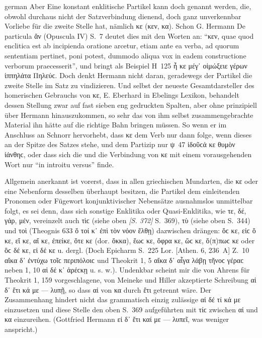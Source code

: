 \begin{otherlanguage*}{german}
Aber Eine konstant enklitische Partikel kann doch genannt werden, die, obwohl durchaus nicht der Satzverbindung dienend, doch ganz unverkennbar Vorliebe für die zweite Stelle hat, nämlich κε (κεν, κα). Schon G. Hermann De particula ἄν (Opuscula IV) S.~7 deutet dies mit den Worten an: “κεν, quae quod enclitica est ab incipienda oratione arcetur, etiam ante ea verba, ad quorum sententiam pertinet, poni potest, dummodo aliqua vox in eadem constructione verborum praecesserit”, und bringt als Beispiel Η~125 ἦ κε μέγ᾽ οἰμώξειε γέρων ἱππηλάτα Πηλεύϲ. Doch denkt Hermann nicht daran, geradewegs der Partikel die zweite Stelle im Satz zu vindizieren. Und selbst der neueste Gesamtdarsteller des homerischen Gebrauchs von κε, Ε. Eberhard in Ebelings Lexikon, behandelt dessen Stellung zwar auf fast sieben eng gedruckten Spalten, aber ohne prinzipiell über Hermann hinauszukommen, so sehr das von ihm selbst zusammengebrachte Material ihn hätte auf die richtige Bahn bringen müssen. So wenn er im Anschluss an Schnorr hervorhebt, dass κε dem Verb nur dann folge, wenn dieses an der Spitze des Satzes stehe, und dem Partizip nur ψ~47 ἰδοῦϲά κε θυμὸν ἰάνθηϲ, oder dass sich die und die Verbindung von κε mit einem vorausgehenden Wort nur “in introitu versus” finde.

Allgemein anerkannt ist vorerst, dass in allen griechischen Mundarten, die κε oder eine Nebenform desselben überhaupt besitzen, die Partikel dem einleitenden Pronomen oder Fügewort konjunktivischer Nebensätze ausnahmslos unmittelbar folgt, es sei denn, dass sich sonstige Enklitika oder Quasi-Enklitika, wie τε, δέ, γάρ, μέν, vereinzelt auch τὶϲ (siehe oben \hypertarget{p372}{\emph{[S. 372]}}\label{p372} S.~369), τὺ (siehe oben S.~344) und τοὶ (Theognis 633 ὅ τοί κ᾽ ἐπὶ τὸν νόον ἔλθῃ) dazwischen drängen: ὅϲ κε, εἰϲ ὅ κε, εἴ κε, αἴ κε, ἐπείκε, ὅτε κε (dor. ὅκκα), ἕωϲ κε, ὄφρα κε, ὥϲ κε, ὅ(π)πωϲ κε oder ὃϲ δέ κε, εἰ δέ κε u. dergl. (Doch Epicharm S.~225 Lor. [Athen. 6, 236~A] Z.~10 αἴκα δ᾽ ἐντύχω τοῖϲ περιπόλοιϲ und Theokrit 1, 5 αἴκα δ᾽ αἶγα λάβῃ τῆνοϲ γέραϲ neben 1, 10 αἰ δέ κ᾽ ἀρέϲκῃ u. s. w.). Undenkbar scheint mir die von Ahrens für Theokrit 1, 159 vorgeschlagene, von Meineke und Hiller akzeptierte Schreibung αἰ δ᾽ ἔτι κά με — λυπῇ, so dass αἰ von κα durch ἔτι getrennt wäre. Der Zusammenhang hindert nicht das grammatisch einzig zulässige αἰ δέ τί κά με einzusetzen und diese Stelle den oben S.~369 aufgeführten mit τίϲ zwischen αἰ und κα einzureihen. (Gottfried Hermann εἰ δ᾽ ἔτι καί με — λυπεῖ, was weniger anspricht.)


\end{otherlanguage*}
